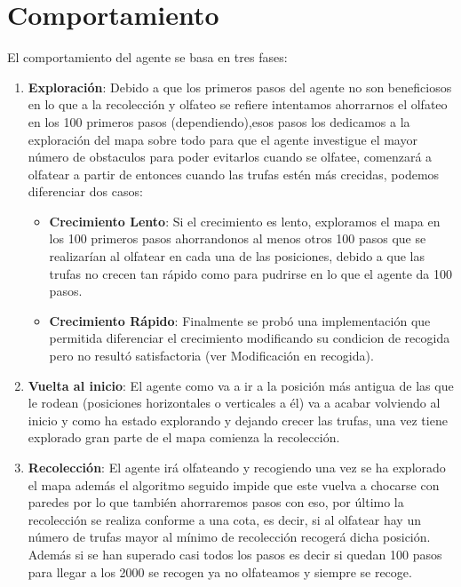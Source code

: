 \documentclass[a4paper, 11pt]{article} %
\begin{document}
\section{Comportamiento}
El comportamiento del agente se basa en tres fases:
\begin{enumerate}
\item \textbf{Exploración}:
Debido a que los primeros pasos del agente no son beneficiosos en lo que a la recolección y olfateo se refiere intentamos ahorrarnos el olfateo en los 100 primeros pasos (dependiendo),esos pasos los dedicamos a la exploración del mapa sobre todo para que el agente investigue el mayor número de obstaculos para poder evitarlos cuando se olfatee, comenzará a olfatear a partir de entonces cuando las trufas estén más crecidas, podemos diferenciar dos casos:
\begin{itemize}
\item \textbf{Crecimiento Lento}: Si el crecimiento es lento, exploramos el mapa en los 100 primeros pasos ahorrandonos al menos otros 100 pasos que se realizarían al olfatear en cada una de las posiciones, debido a que las trufas no crecen tan rápido como para pudrirse en lo que el agente da 100 pasos.
\item \textbf{Crecimiento Rápido}: Finalmente se probó una implementación que permitida diferenciar el crecimiento modificando su condicion de recogida pero no resultó satisfactoria (ver Modificación en recogida).
\end{itemize}
\item \textbf{Vuelta al inicio}:
El agente como va a ir a la posición más antigua de las que le rodean (posiciones horizontales o verticales a él) va a acabar volviendo al inicio y como ha estado explorando y dejando crecer las trufas, una vez tiene explorado gran parte de el mapa comienza la recolección.
\item \textbf{Recolección}:
El agente irá olfateando y recogiendo una vez se ha explorado el mapa además el algoritmo seguido impide que este vuelva a chocarse con paredes por lo que también ahorraremos pasos con eso, por último la recolección se realiza conforme a una cota, es decir, si al olfatear hay un número de trufas mayor al mínimo de recolección recogerá dicha posición. Además si se han superado casi todos los pasos es decir si quedan 100 pasos para llegar a los 2000 se recogen ya no olfateamos y siempre se recoge.
\end{enumerate}
\end{document}
